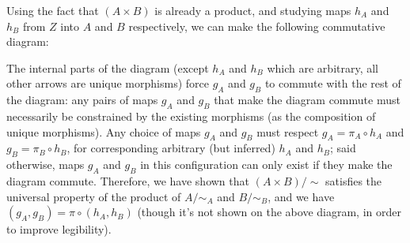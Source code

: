 \documentclass[12pt, letterpaper, twoside]{report}
\begin{document}
Using the fact that $(A \times B)$ is already a product, and studying maps $h_A$ and $h_B$ from $Z$ into $A$ and $B$ respectively, we can make the following commutative diagram:


The internal parts of the diagram (except $h_A$ and $h_B$ which are arbitrary, all other arrows are unique morphisms) force $g_A$ and $g_B$ to commute with the rest of the diagram: any pairs of maps $g_A$ and $g_B$ that make the diagram commute must necessarily be constrained by the existing morphisms (as the composition of unique morphisms). Any choice of maps $g_A$ and $g_B$ must respect $g_A = \pi_A \circ h_A$ and $g_B = \pi_B \circ h_B$, for corresponding arbitrary (but inferred) $h_A$ and $h_B$; said otherwise, maps $g_A$ and $g_B$ in this configuration can only exist if they make the diagram commute. Therefore, we have shown that $(A \times B)/\sim$ satisfies the universal property of the product of $A/\sim_A$ and $B/\sim_B$, and we have $(g_A, g_B) = \pi \circ (h_A, h_B)$ (though it's not shown on the above diagram, in order to improve legibility).
\end{document}

